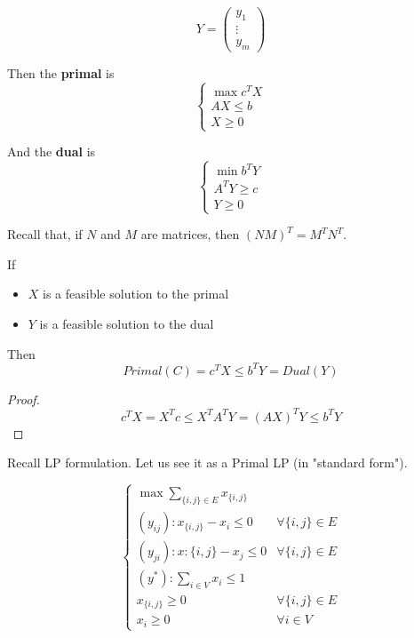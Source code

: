     \begin{equation}
        Y = 
        \begin{pmatrix}
            y_1\\
            \vdots\\
            y_m
        \end{pmatrix}
    \end{equation}

    Then the \textbf{primal} is
    \begin{equation}
        \begin{cases}
            \max c^T X\\
            AX \leq b\\
            X \geq 0
        \end{cases}
    \end{equation}

    And the \textbf{dual} is
    \begin{equation}
        \begin{cases}
            \min b^T Y\\
            A^T Y \geq c\\
            Y \geq 0
        \end{cases}
    \end{equation}

    Recall that, if $N$ and $M$ are matrices, then $(N M)^T = M^T N^T$.

    \begin{theorem}
        If 
        \begin{itemize}
            \item $X$ is a feasible solution to the primal
            \item $Y$ is a feasible solution to the dual
        \end{itemize}

        Then 
        \[ Primal(C) = c^T X \leq b^T Y = Dual(Y) \]
    \end{theorem}

    \begin{proof}
        \[ c^T X = X^T c \leq X^T A^T Y = (A X)^T Y \leq b^T Y \]
    \end{proof}


    Recall  LP formulation.
    Let us see it as a Primal LP (in "standard form").

    \begin{equation}
        \begin{cases}
            \max \sum_{\{i,j\} \in E} x_{\{i,j\}}\\
            (y_{ij}): x_{\{i,j\}} - x_i \leq 0  & \forall \{i,j\} \in E\\
            (y_{ji}): x:{\{i,j\}} - x_j \leq 0  & \forall \{i,j\} \in E\\
            (y^*): \sum_{i \in V} x_i \leq 1\\
            x_{\{i,j\}} \geq 0                  & \forall \{i,j\} \in E\\
            x_i \geq 0                          & \forall i \in V
        \end{cases}
    \end{equation}

